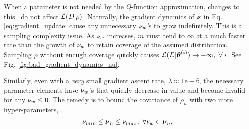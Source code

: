     When a parameter \paramElem is not needed by the \textit{Q}-function approximation, \ie changes to this \paramElem\
    do not affect $\mathcal{L}(D|\rho)$. Naturally, the gradient dynamics of $\boldsymbol{\mathbb{\nu}}$ in Eq.  \ref{eq:gradient_update}
    cause any unnecessary $\nu_{w}$\!'s to grow indefinitely. This is a sampling complexity issue. As
    $\nu_{w}$ increases, $ m $ must tend to $\infty$ at a much faster rate than the growth of $\nu_{w}$
    to retain coverage of the assumed distribution. Sampling $\rho$ without enough coverage quickly causes
    $\logLike(D|\paramVec^{(i)}) \rightarrow -\infty,\ \forall\ i$. See Fig. \ref{fig:bad_gradient_dynamics_nu}.

    \begin{figure}[htb]
        \begin{center}
        \end{center}
    \end{figure}


    \begin{figure}[htb]
        \begin{center}
        \end{center}
    \end{figure}


    Similarly, even with a \textit{very} small gradient ascent rate, $\lambda \approx 1\mathrm{e}-6$, the necessary
    parameter elements have $\nu_{w}$\!'s that quickly decrease in value and become invalid for any
    $\nu_{w}\leq 0$. The remedy is to bound the covariance of $\rho_n$ with two more hyper-parameters,
    \begin{equation}\label{eq:param_var_bounds}
    \nu_{min} \leq \boldsymbol{\mathbb{\nu}}_n \leq \nu_{max},\ \forall \nu_w \in \boldsymbol{\mathbb{\nu}}_n.
    \end{equation}

